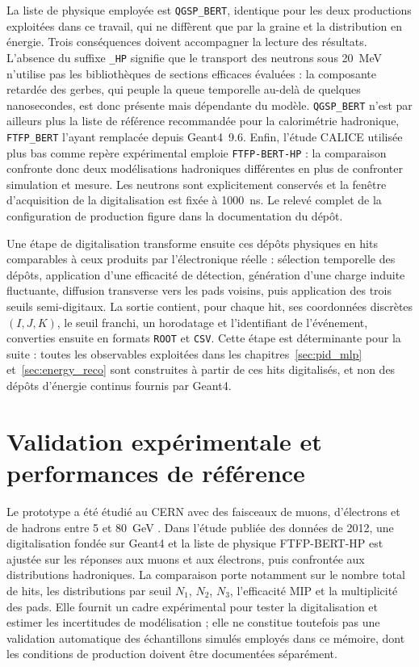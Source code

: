 La liste de physique employée est \texttt{QGSP\_BERT}, identique pour les deux productions exploitées dans ce travail, qui ne diffèrent que par la graine et la distribution en énergie. Trois conséquences doivent accompagner la lecture des résultats. L'absence du suffixe \texttt{\_HP} signifie que le transport des neutrons sous 20~MeV n'utilise pas les bibliothèques de sections efficaces évaluées : la composante retardée des gerbes, qui peuple la queue temporelle au-delà de quelques nanosecondes, est donc présente mais dépendante du modèle. \texttt{QGSP\_BERT} n'est par ailleurs plus la liste de référence recommandée pour la calorimétrie hadronique, \texttt{FTFP\_BERT} l'ayant remplacée depuis Geant4~9.6. Enfin, l'étude CALICE utilisée plus bas comme repère expérimental emploie \texttt{FTFP-BERT-HP} : la comparaison confronte donc deux modélisations hadroniques différentes en plus de confronter simulation et mesure. Les neutrons sont explicitement conservés et la fenêtre d'acquisition de la digitalisation est fixée à 1000~ns. Le relevé complet de la configuration de production figure dans la documentation du dépôt.

Une étape de digitalisation transforme ensuite ces dépôts physiques en hits comparables à ceux produits par l'électronique réelle : sélection temporelle des dépôts, application d'une efficacité de détection, génération d'une charge induite fluctuante, diffusion transverse vers les pads voisins, puis application des trois seuils semi-digitaux. La sortie contient, pour chaque hit, ses coordonnées discrètes \((I,J,K)\), le seuil franchi, un horodatage et l'identifiant de l'événement, converties ensuite en formats \texttt{ROOT} \cite{root} et \texttt{CSV}. Cette étape est déterminante pour la suite : toutes les observables exploitées dans les chapitres~\ref{sec:pid_mlp} et~\ref{sec:energy_reco} sont construites à partir de ces hits digitalisés, et non des dépôts d'énergie continus fournis par Geant4.

\section{Validation expérimentale et performances de référence}

Le prototype a été étudié au CERN avec des faisceaux de muons, d'électrons et de hadrons entre 5 et 80~GeV \cite{calice2015sdhcal, calice2016sdhcal}. Dans l'étude publiée des données de 2012, une digitalisation fondée sur Geant4 et la liste de physique FTFP-BERT-HP est ajustée sur les réponses aux muons et aux électrons, puis confrontée aux distributions hadroniques. La comparaison porte notamment sur le nombre total de hits, les distributions par seuil \(N_1\), \(N_2\), \(N_3\), l'efficacité MIP et la multiplicité des pads. Elle fournit un cadre expérimental pour tester la digitalisation et estimer les incertitudes de modélisation ; elle ne constitue toutefois pas une validation automatique des échantillons simulés employés dans ce mémoire, dont les conditions de production doivent être documentées séparément.

